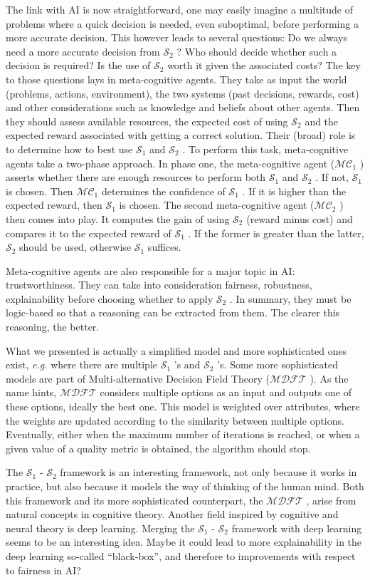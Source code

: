 \documentclass[oneside, 10pt]{article}
\newcommand{\so}{\ensuremath{\mathcal{S}_1} }
\newcommand{\st}{\ensuremath{\mathcal{S}_2} }
\newcommand{\mco}{\ensuremath{\mathcal{MC}_1} }
\newcommand{\mct}{\ensuremath{\mathcal{MC}_2} }
\newcommand{\mdft}{\ensuremath{\mathcal{MDFT}} }
\begin{document}
The link with AI is now straightforward, one may easily imagine a multitude of problems where a quick decision is needed, even suboptimal, before performing a more accurate decision. This however leads to several questions: Do we always need a more accurate decision from \st? Who should decide whether such a decision is required? Is the use of \st worth it given the associated costs? The key to those questions lays in meta-cognitive agents. They take as input the world (problems, actions, environment), the two systems (past decisions, rewards, cost) and other considerations such as knowledge and beliefs about other agents. Then they should assess available resources, the expected cost of using \st and the expected reward associated with getting a correct solution. Their (broad) role is to determine how to best use \so and \st. To perform this task, meta-cognitive agents take a two-phase approach. In phase one, the meta-cognitive agent (\mco) asserts whether there are enough resources to perform both \so and \st. If not, \so is chosen. Then \mco determines the confidence of \so. If it is higher than the expected reward, then \so is chosen. The second meta-cognitive agent (\mct) then comes into play. It computes the gain of using \st (reward minus cost) and compares it to the expected reward of \so. If the former is greater than the latter, \st should be used, otherwise \so suffices.

Meta-cognitive agents are also responsible for a major topic in AI: trustworthiness. They can take into consideration fairness, robustness, explainability before choosing whether to apply \st. In summary, they must be logic-based so that a reasoning can be extracted from them. The clearer this reasoning, the better.

What we presented is actually a simplified model and more sophisticated ones exist, \textit{e.g.} where there are multiple \so's and \st's. Some more sophisticated models are part of Multi-alternative Decision Field Theory (\mdft). As the name hints, \mdft considers multiple options as an input and outputs one of these options, ideally the best one. This model is weighted over attributes, where the weights are updated according to the similarity between multiple options. Eventually, either when the maximum number of iterations is reached, or when a given value of a quality metric is obtained, the algorithm should stop.

The \so- \st framework is an interesting framework, not only because it works in practice, but also because it models the way of thinking of the human mind. Both this framework and its more sophisticated counterpart, the \mdft, arise from natural concepts in cognitive theory. Another field inspired by cognitive and neural theory is deep learning. Merging the \so- \st framework with deep learning seems to be an interesting idea. Maybe it could lead to more explainability in the deep learning so-called ``black-box'', and therefore to improvements with respect to fairness in AI?
\end{document}
